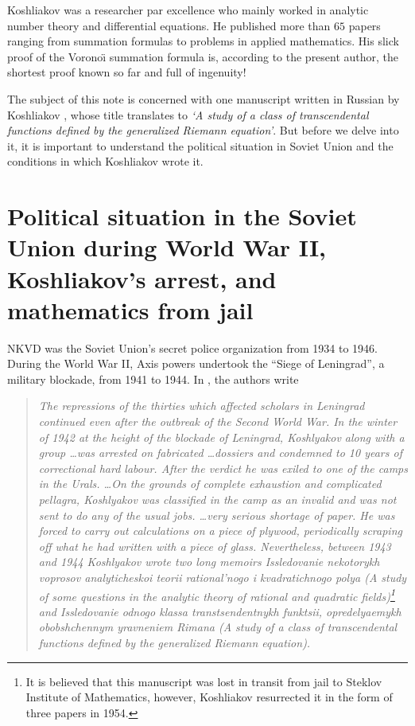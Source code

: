 \documentclass[12pt,reqno]{amsart}
\renewcommand{\(}{\left\(}
\renewcommand{\)}{\right\)}
\renewcommand{\[}{\left\[}
\renewcommand{\]}{\right\]}
\let\dotlessi=\i
\numberwithin{equation}{section}
\theoremstyle{plain}
\begin{document}
Koshliakov was a researcher par excellence who mainly worked in analytic number theory and differential equations. He published more than $65$ papers ranging from summation formulas to problems in applied mathematics. His slick proof of the Vorono\"{\dotlessi} summation formula \cite{koshliakov} is, according to the present author, the shortest proof known so far and full of ingenuity!

The subject of this note is concerned with one manuscript written in Russian by Koshliakov \cite{koshliakov3}, whose title translates to \emph{`A study of a class of transcendental functions defined by the generalized Riemann equation'}. But before we delve into it, it is important to understand the political situation in Soviet Union and the conditions in which Koshliakov wrote it.

\section{Political situation in the Soviet Union during World War II, Koshliakov's arrest, and mathematics from jail}
NKVD was the Soviet Union's secret police organization from 1934 to 1946. During the World War II, Axis powers undertook the ``Siege of Leningrad'', a military blockade, from 1941 to 1944. In \cite{bfikm}, the authors write

\begin{quote} \emph{The repressions of the thirties which affected scholars in Leningrad continued even after the outbreak of the Second World War. In the winter of 1942 at the height of the blockade of Leningrad, Koshlyakov along with a group \dots was arrested on fabricated \dots dossiers and condemned to 10 years of correctional hard labour.  After the verdict he was exiled to one of the camps in the Urals. \dots On the grounds of complete exhaustion and complicated pellagra, Koshlyakov was classified in the camp as an invalid and was not sent to do any of the usual jobs. \dots very serious shortage of paper.  He was forced to carry out calculations on a piece of plywood, periodically scraping off what he had written with a piece of glass. Nevertheless, between 1943 and 1944 Koshlyakov wrote two long memoirs \emph{Issledovanie nekotorykh voprosov analyticheskoi teorii rational'nogo i
		kvadratichnogo polya} (A study of some questions in the analytic theory of
	rational and quadratic fields)\footnote{It is believed that this manuscript was lost in transit from jail to Steklov	Institute of Mathematics, however, Koshliakov resurrected it in the form of three papers \cite{koshliakov6} in 1954.} and \emph{Issledovanie odnogo klassa transtsendentnykh
		funktsii, opredelyaemykh obobshchennym yravneniem Rimana} (A study of a class
	of transcendental functions defined by the generalized Riemann equation).} \end{quote}
\end{document}
